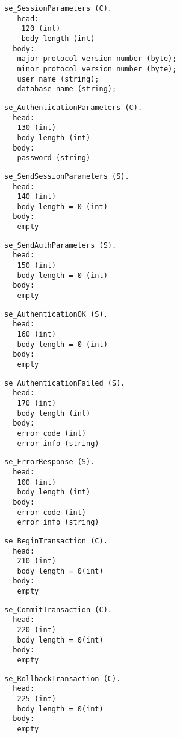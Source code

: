 \documentclass[a4paper,12pt]{article}
\begin{document}
\begin{verbatim}
se_SessionParameters (C).
   head:
    120 (int)
    body length (int)
  body:
   major protocol version number (byte);
   minor protocol version number (byte);
   user name (string);
   database name (string);
\end{verbatim}   

\begin{verbatim}
se_AuthenticationParameters (C).
  head:
   130 (int)
   body length (int)
  body:
   password (string)
\end{verbatim}   

\begin{verbatim}
se_SendSessionParameters (S).
  head:
   140 (int)
   body length = 0 (int)
  body:
   empty 
\end{verbatim}
   
\begin{verbatim}
se_SendAuthParameters (S).
  head:
   150 (int)
   body length = 0 (int)
  body:
   empty
\end{verbatim}   
  
\begin{verbatim}  
se_AuthenticationOK (S).
  head:
   160 (int)
   body length = 0 (int)
  body:
   empty
\end{verbatim}   

\begin{verbatim}
se_AuthenticationFailed (S).
  head:
   170 (int)
   body length (int)
  body:
   error code (int)
   error info (string)
\end{verbatim}

\begin{verbatim}
se_ErrorResponse (S).
  head:
   100 (int)
   body length (int)
  body:
   error code (int)
   error info (string)
\end{verbatim}   

\begin{verbatim}
se_BeginTransaction (C).
  head:
   210 (int)
   body length = 0(int)
  body:
   empty
\end{verbatim}   

\begin{verbatim}
se_CommitTransaction (C).
  head:
   220 (int)
   body length = 0(int)
  body:
   empty
\end{verbatim}   

\begin{verbatim}
se_RollbackTransaction (C).
  head:
   225 (int)
   body length = 0(int)
  body:
   empty
\end{verbatim}   
\end{document}
